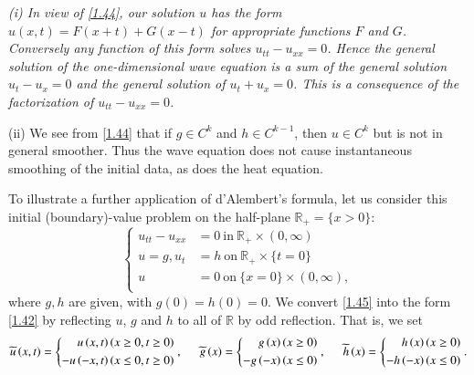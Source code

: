 \begin{note}\em
(i) In view of \eqref{1.44}, our solution $u$ has the form $u(x,t)=F(x+t)+G(x-t)$ for appropriate functions $F$ and $G$. Conversely any function of this form solves $u_{tt}-u_{xx}=0$. Hence the general solution of the one-dimensional wave equation is a sum of the general solution $u_t-u_x=0$ and the general solution of $u_t+u_x=0$. This is a consequence of the factorization of $u_{tt}-u_{xx}=0$.\par
(ii) We see from \eqref{1.44} that if $g\in C^k$ and $h\in C^{k-1}$, then $u\in C^k$ but is not in general smoother. Thus the wave equation does not cause instantaneous smoothing of the initial data, as does the heat equation.
\end{note}
To illustrate a further application of d'Alembert's formula, let us consider this initial (boundary)-value problem on the half-plane $\mathbb{R}_+=\{x>0\}$: 
\begin{equation}\label{1.45}
\left\{ \begin{aligned}
	u_{tt}-u_{xx}&=0\ \text{in}\ \mathbb{R}_+\times(0,\infty)\\
	u=g,u_t&=h\ \text{on}\ \mathbb{R}_+\times\{t=0\}\\
	u&=0\ \text{on}\ \{x=0\}\times(0,\infty),\\
\end{aligned} \right. 
\end{equation}
where $g,h$ are given, with $g(0)=h(0)=0$. We convert \eqref{1.45} into the form \eqref{1.42} by reflecting $u$, $g$ and $h$ to all of $\mathbb{R}$ by odd reflection. That is, we set 
$$
\widetilde{u}\left( x,t \right) =\left\{ \begin{aligned}
	u\left( x,t \right) &\left( x\ge 0,t\ge 0 \right)\\
	-u\left( -x,t \right) &\left( x\le 0,t\ge 0 \right)\\
\end{aligned} \right. ,\hspace{0.5cm}\widetilde{g}\left( x \right) =\left\{ \begin{aligned}
	g\left( x \right) &\left( x\ge 0 \right)\\
	-g\left( -x \right) &\left( x\le 0 \right)\\
\end{aligned} \right. ,\hspace{0.5cm}\widetilde{h}\left( x \right) =\left\{ \begin{aligned}
	h\left( x \right) &\left( x\ge 0 \right)\\
	-h\left( -x \right) &\left( x\le 0 \right)\\
\end{aligned} \right. .
$$
